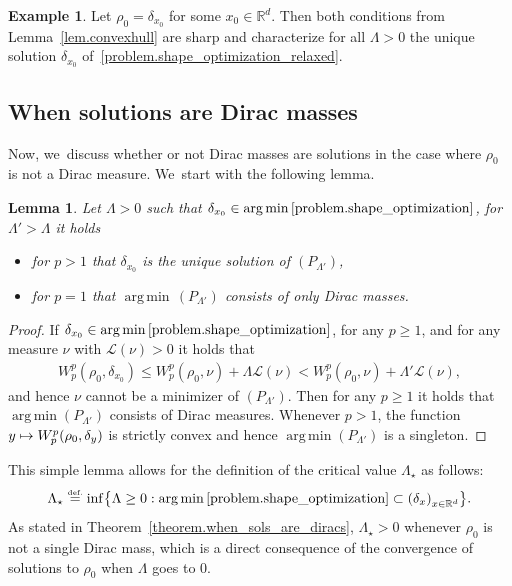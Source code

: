 \documentclass[10pt]{amsart}
\newcommand\mto{\mathchoice{\longmapsto}{\mapsto}{\mapsto}{\mapsto}}
\newtheorem{lemma}[theorem]{Lemma}
\theoremstyle{definition}
\newtheorem{example}[theorem]{Example}
\newcommand{\eqdef}{\ensuremath{\stackrel{\mbox{\upshape\tiny def.}}{=}}}
\newcommand{\RR}{\mathbb{R}}
\DeclareMathOperator*{\argmin}{arg\,min}
\begin{document}
\begin{example}
Let $\rho_0= \delta_{x_0}$ for some $x_0 \in \RR^d$. Then both
conditions from Lemma~\ref{lem.convexhull} are sharp and
characterize for all $\Lambda>0$ the unique solution $\delta_{x_0}$
of~\eqref{problem.shape_optimization_relaxed}.
\end{example}

\subsection{When solutions are Dirac masses}
Now, we~discuss whether or not Dirac masses are solutions in the case where $\rho_0$ is not a Dirac measure. We~start with the following lemma.

\begin{lemma}\label{lemma.trashold_lambda}
Let $\Lambda > 0$ such that $\delta_{x_0} \in \argmin\eqref{problem.shape_optimization}$,
for $\Lambda' > \Lambda$ it holds
\begin{itemize}
\item for $p > 1$ that $\delta_{x_0}$ is the unique solution
of $(P_{\Lambda'})$,
\item for $p = 1$ that $\argmin\, (P_{\Lambda'})$
consists of only Dirac masses.
\end{itemize}
\end{lemma}

\begin{proof}
If $\delta_{x_0} \in \argmin \eqref{problem.shape_optimization}$, for any $p \ge 1$, and for any measure $\nu$ with $\mathcal{L}(\nu) > 0$ it holds that
\begin{align*}
W_p^p(\rho_0, \delta_{x_0})
\le
W_p^p(\rho_0, \nu) + \Lambda \mathcal{L}(\nu)
<
W_p^p(\rho_0, \nu) + \Lambda' \mathcal{L}(\nu),
\end{align*}
and hence $\nu$ cannot be a minimizer of $(P_{\Lambda'})$. Then for any $p \ge 1$ it holds that $\argmin (P_{\Lambda'})$ consists of Dirac measures. Whenever $p > 1$, the function $y \mto W_p^p(\rho_0, \delta_y)$ is strictly convex and hence $\argmin (P_{\Lambda'})$ is a singleton.
\end{proof}

This simple lemma allows for the definition of the critical value $\Lambda_\star$ as follows:
\begin{equation}
\Lambda_\star
\eqdef
\inf
\bigl\{
\Lambda \ge 0:
\argmin \eqref{problem.shape_optimization}
\subset
\left(
\delta_{x}\right)_{x \in \RR^d}
\bigr\}.
\end{equation}
As stated in Theorem~\ref{theorem.when_sols_are_diracs}, $\Lambda_\star > 0$ whenever $\rho_0$ is not a single Dirac mass, which is a direct consequence of the convergence of solutions to $\rho_0$ when $\Lambda$ goes to $0$.
\end{document}
